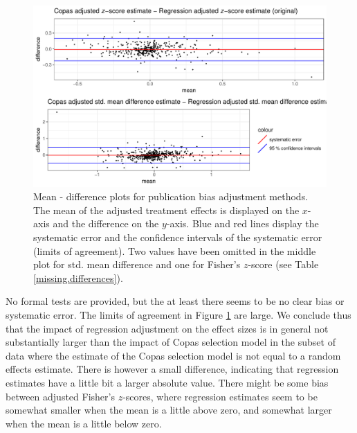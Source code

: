 \documentclass[11pt,a4paper,twoside]{book}\usepackage[]{graphicx}\usepackage[]{color}
\newenvironment{knitrout}{}{} %
\begin{document}
\begin{figure}
\begin{knitrout}
\color{fgcolor}

{\centering \includegraphics[width=\textwidth-3cm]{figure/ch03_figunnamed-chunk-24-1} 

}



\end{knitrout}
\caption{Mean - difference plots for publication bias adjustment methods. The mean of the adjusted treatment effects is displayed on the $x$-axis and the difference on the $y$-axis. Blue and red lines display the systematic error and the confidence intervals of the systematic error (limits of agreement). Two values have been omitted in the middle plot for std. mean difference and one for Fisher's $z$-score (see Table \ref{missing.differences}).}
\label{fig:adjustment.mean.diff}
\end{figure}

No formal tests are provided, but the at least there seems to be no clear bias or systematic error. The limits of agreement in Figure \ref{fig:adjustment.mean.diff} are large. We conclude thus that the impact of regression adjustment on the effect sizes is in general not substantially larger than the impact of Copas selection model in the subset of data where the estimate of the Copas selection model is not equal to a random effects estimate. There is however a small difference, indicating that regression estimates have a little bit a larger absolute value. There might be some bias between adjusted Fisher's $z$-scores, where regression estimates seem to be somewhat smaller when the mean is a little above zero, and somewhat larger when the mean is a little below zero. \\
\end{document}
